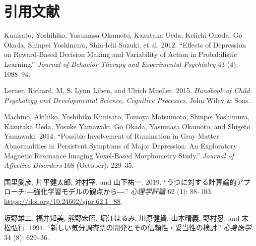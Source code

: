 \documentclass[11pt,a4paper,xelatex,ja=standard]{bxjsarticle}
\begin{document}
\hypertarget{ux5f15ux7528ux6587ux732e}{%
\section{引用文献}\label{ux5f15ux7528ux6587ux732e}}

\hypertarget{refs}{}
\leavevmode\hypertarget{ref-Kunisato2012}{}%
Kunisato, Yoshihiko, Yasumasa Okamoto, Kazutaka Ueda, Keiichi Onoda, Go
Okada, Shinpei Yoshimura, Shin-Ichi Suzuki, et al. 2012. ``Effects of
Depression on Reward-Based Decision Making and Variability of Action in
Probabilistic Learning.'' \emph{Journal of Behavior Therapy and
Experimental Psychiatry} 43 (4): 1088--94.

\leavevmode\hypertarget{ref-lerner2015handbook}{}%
Lerner, Richard, M, S. Lynn Liben, and Ulrich Mueller. 2015.
\emph{Handbook of Child Psychology and Developmental Science, Cognitive
Processes}. John Wiley \& Sons.

\leavevmode\hypertarget{ref-Machino2014}{}%
Machino, Akihiko, Yoshihiko Kunisato, Tomoya Matsumoto, Shinpei
Yoshimura, Kazutaka Ueda, Yosuke Yamawaki, Go Okada, Yasumasa Okamoto,
and Shigeto Yamawaki. 2014. ``Possible Involvement of Rumination in Gray
Matter Abnormalities in Persistent Symptoms of Major Depression: An
Exploratory Magnetic Resonance Imaging Voxel-Based Morphometry Study.''
\emph{Journal of Affective Disorders} 168 (October): 229--35.

\leavevmode\hypertarget{ref-kunisato2019}{}%
国里愛彦, 片平健太郎, 沖村宰, and 山下祐一. 2019.
``うつに対する計算論的アプローチ:―強化学習モデルの観点から―.''
\emph{心理学評論} 62 (1): 88--103.
\url{https://doi.org/10.24602/sjpr.62.1_88}.

\leavevmode\hypertarget{ref-ux5742ux91ceux96c4ux4e8c1994}{}%
坂野雄二, 福井知美, 熊野宏昭, 堀江はるみ, 川原健資, 山本晴義, 野村忍,
and 末松弘行. 1994.
``新しい気分調査票の開発とその信頼性・妥当性の検討.'' \emph{心身医学} 34
(8): 629--36.



\end{document}
